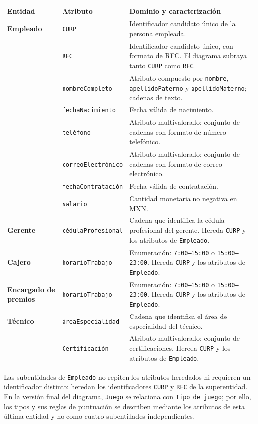\begin{center}
\small
\begin{tabularx}{\textwidth}{@{}>{\bfseries\color{unamblue}}p{}p{}X@{}}
\toprule
Entidad & Atributo & Dominio y caracterización \\
\midrule
Empleado & \texttt{CURP} & Identificador candidato único de la persona
   empleada. \\
 & \texttt{RFC} & Identificador candidato único, con formato de RFC. El
   diagrama subraya tanto \texttt{CURP} como \texttt{RFC}. \\
 & \texttt{nombreCompleto} & Atributo compuesto por \texttt{nombre},
   \texttt{apellidoPaterno} y \texttt{apellidoMaterno}; cadenas de texto. \\
 & \texttt{fechaNacimiento} & Fecha válida de nacimiento. \\
 & \texttt{teléfono} & Atributo multivalorado; conjunto de cadenas con formato
   de número telefónico. \\
 & \texttt{correoElectrónico} & Atributo multivalorado; conjunto de cadenas con formato
   de correo electrónico. \\
 & \texttt{fechaContratación} & Fecha válida de contratación. \\
 & \texttt{salario} & Cantidad monetaria no negativa en MXN. \\
\midrule
Gerente & \texttt{cédulaProfesional} & Cadena que identifica la cédula
   profesional del gerente. Hereda \texttt{CURP} y los atributos de
   \texttt{Empleado}. \\
\midrule
Cajero & \texttt{horarioTrabajo} & Enumeración: \texttt{7:00--15:00} o
   \texttt{15:00--23:00}. Hereda \texttt{CURP} y los atributos de
   \texttt{Empleado}. \\
\midrule
Encargado de premios & \texttt{horarioTrabajo} & Enumeración: \texttt{7:00--15:00}
   o \texttt{15:00--23:00}. Hereda \texttt{CURP} y los atributos de
   \texttt{Empleado}. \\
\midrule
Técnico & \texttt{áreaEspecialidad} & Cadena que identifica el área de especialidad
   del técnico. \\
 & \texttt{Certificación} & Atributo multivalorado; conjunto de
   certificaciones. Hereda \texttt{CURP} y los
   atributos de \texttt{Empleado}. \\
\bottomrule
\end{tabularx}
\end{center}

Las subentidades de \texttt{Empleado} no repiten los atributos heredados ni
requieren un identificador distinto: heredan los identificadores
\texttt{CURP} y \texttt{RFC} de la superentidad. En la versión final del
diagrama, \texttt{Juego} se
relaciona con \texttt{Tipo de juego}; por ello, los tipos y sus reglas de
puntuación se describen mediante los atributos de esta última entidad y no
como cuatro subentidades independientes.
